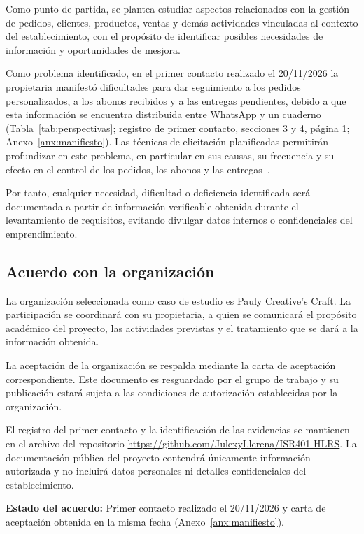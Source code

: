 \documentclass[11pt,a4paper]{article}
\begin{document}
	Como punto de partida, se plantea estudiar aspectos relacionados con la gestión de pedidos, clientes, productos, ventas y demás actividades vinculadas al contexto del establecimiento, con el propósito de identificar posibles necesidades de información y oportunidades de mesjora.
	
	
	Como problema identificado, en el primer contacto realizado el 20/11/2026 la propietaria manifestó dificultades para dar seguimiento a los pedidos personalizados, a los abonos recibidos y a las entregas pendientes, debido a que esta información se encuentra distribuida entre WhatsApp y un cuaderno (Tabla~\ref{tab:perspectivas}; registro de primer contacto, secciones 3 y 4, página 1; Anexo~\ref{anx:manifiesto}). Las técnicas de elicitación planificadas permitirán profundizar en este problema, en particular en sus causas, su frecuencia y su efecto en el control de los pedidos, los abonos y las entregas~\cite{jimenez2024orders}.
	
	Por tanto, cualquier necesidad, dificultad o deficiencia identificada será documentada a partir de información verificable obtenida durante el levantamiento de requisitos, evitando divulgar datos internos o confidenciales del emprendimiento.
	
	\subsection{Acuerdo con la organización}
	
	La organización seleccionada como caso de estudio es Pauly Creative's Craft. La participación se coordinará con su propietaria, a quien se comunicará el propósito académico del proyecto, las actividades previstas y el tratamiento que se dará a la información obtenida.
	
	La aceptación de la organización se respalda mediante la carta de aceptación correspondiente. Este documento es resguardado por el grupo de trabajo y su publicación estará sujeta a las condiciones de autorización establecidas por la organización.
	
	El registro del primer contacto y la identificación de las evidencias se mantienen en el archivo  del repositorio \url{https://github.com/JulexyLlerena/ISR401-HLRS}. La documentación pública del proyecto contendrá únicamente información autorizada y no incluirá datos personales ni detalles confidenciales del establecimiento.
	
	\textbf{Estado del acuerdo:} Primer contacto realizado el 20/11/2026 y carta de aceptación obtenida en la misma fecha (Anexo~\ref{anx:manifiesto}).
	
\end{document}
